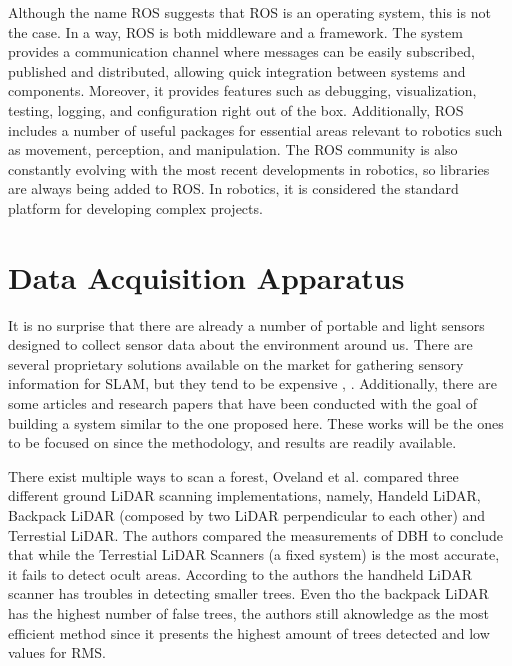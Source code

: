 Although the name \acl*{ROS} suggests that ROS is an operating system, this is not the case.  In a way, \acs*{ROS} is both middleware and a framework. The system provides a communication channel where messages can be easily subscribed, published and distributed, allowing quick integration between systems and components. Moreover, it provides features such as debugging, visualization, testing, logging, and configuration right out of the box. Additionally, ROS includes a number of useful packages for essential areas relevant to robotics such as movement, perception, and manipulation. The ROS community is also constantly evolving with the most recent developments in robotics, so libraries are always being added to ROS. In robotics, it is considered the standard platform for developing complex projects.


\section{Data Acquisition Apparatus}

It is no surprise that there are already a number of portable and light sensors designed to collect sensor data about the environment around us. There are several proprietary solutions available on the market for gathering sensory information for \acs*{SLAM}, but they tend to be expensive \cite{libackpack_C50}, \cite{libackpack_DGC50}. Additionally, there are some articles and research papers that have been conducted with the goal of building a system similar to the one proposed here. These works will be the ones to be focused on since the methodology, and results are readily available.

There exist multiple ways to scan a forest, Oveland et al. \cite{oveland_comparing_2018} compared three different ground LiDAR scanning implementations, namely, Handeld LiDAR, Backpack LiDAR (composed by two \acs*{LiDAR} perpendicular to each other) and Terrestial LiDAR. The authors compared the measurements of \acs*{DBH} to conclude that while the Terrestial LiDAR Scanners (a fixed system) is the most accurate, it fails to detect ocult areas. According to the authors the handheld LiDAR scanner has troubles in detecting smaller trees. Even tho the backpack LiDAR has the highest number of false trees, the authors still aknowledge as the most efficient method since it presents the highest amount of trees detected and low values for \acs*{RMS}.


